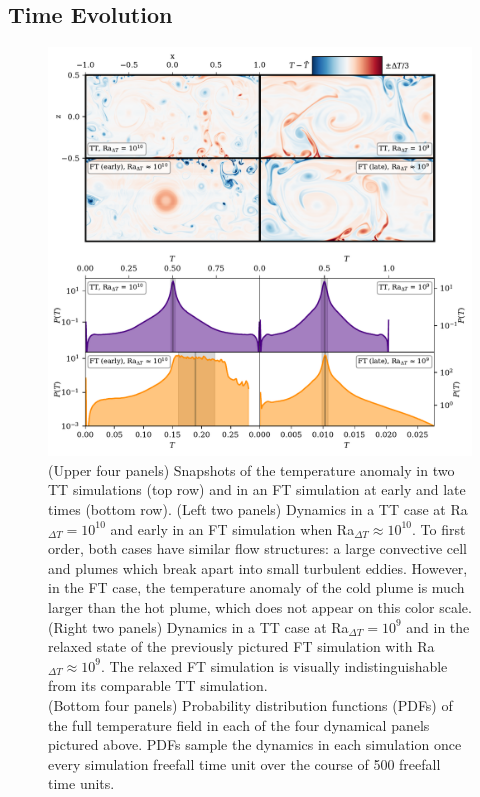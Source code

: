 \documentclass[aps, pre, onecolumn, nofootinbib, notitlepage, groupedaddress, amsfonts, amssymb, amsmath, longbibliography, superscriptaddress]{revtex4-1}
\begin{document}
\subsection{Time Evolution}
\label{sec:time_evolution}

\begin{figure}[p!]
\includegraphics[width=\textwidth]{./figs/rbc_evolution_dynamics.pdf}
\caption{ 
	(Upper four panels) Snapshots of the temperature anomaly in two TT simulations (top row) and in an FT simulation at early and late times (bottom row).
	(Left two panels) Dynamics in a TT case at Ra$_{\Delta T} = 10^{10}$ and early in an FT simulation when Ra$_{\Delta T} \approx 10^{10}$.
	To first order, both cases have similar flow structures: a large convective cell and plumes which break apart into small turbulent eddies.
	However, in the FT case, the temperature anomaly of the cold plume is much larger than the hot plume, which does not appear on this color scale.
	(Right two panels) Dynamics in a TT case at Ra$_{\Delta T} = 10^9$ and in the relaxed state of the previously pictured FT simulation with Ra$_{\Delta T} \approx 10^9$.
	The relaxed FT simulation is visually indistinguishable from its comparable TT simulation.
\\	
	(Bottom four panels) Probability distribution functions (PDFs) of the full temperature field in each of the four dynamical panels pictured above.
	PDFs sample the dynamics in each simulation once every simulation freefall time unit over the course of 500 freefall time units.
}
\end{figure}
\end{document}
